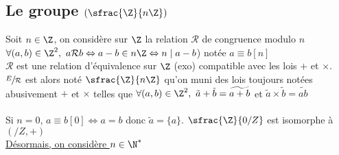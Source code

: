 	\subsection{Le groupe $(\sfrac{\Z}{n\Z})$}
		Soit $n\in \Z$, on considère sur $\Z$ la relation $\mathcal{R}$ de congruence modulo $n$ 
		\\$\forall (a,b)\in \Z^2,~ a\mathcal{R} b \Leftrightarrow a-b\in n\Z \Leftrightarrow n\mid a-b$) notée $a\equiv b[n]$ \vspace*{0.2cm} \\
		$\mathcal{R}$ est une relation d'équivalence sur $\Z$ (exo) compatible avec les lois $+$ et $\times$. 
		$\sfrac{E}{\mathcal{R}}$ est alors noté $\sfrac{\Z}{n\Z}$ qu'on muni des lois toujours notées abusivement $+$ et $\times$ telles que 
		$\forall (a,b)\in \Z^2,~ \tilde{a}+\tilde{b} = \widetilde{a+b}$ et $\tilde{a} \times\tilde{b} = \widetilde{ab}$
		\vspace*{0.5cm} \\ 
		\\ Si $n=0$, $a\equiv b[0] \Leftrightarrow a=b$ donc $\tilde{a}=\{a\}$. $\sfrac{\Z}{0/Z}$ est isomorphe à $(/Z,+)$ \vspace*{0.3cm} \\
		\uline{Désormais, on considère $n\in \N^*$}
		\vspace*{0.5cm} \\ 
		\vspace*{0.5cm} \\  \\ \traitd
